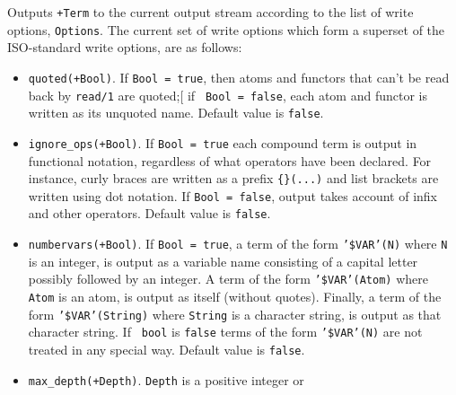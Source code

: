 \begin{description}
%
Outputs {\tt +Term} to the current output stream according to the list
of write options, {\tt Options}.  The current set of write options
which form a superset of the ISO-standard write options, are as
follows:
%
\begin{itemize}
%
\item {\tt quoted(+Bool)}.  If {\tt Bool = true}, then atoms and
  functors that can't be read back by {\tt read/1} are quoted;[ if {\tt
    Bool = false}, each atom and functor is written as its unquoted
  name. Default value is {\tt false}.
%
\item {\tt ignore\_ops(+Bool)}. If {\tt Bool = true} each compound
  term is output in functional notation, regardless of what operators
  have been declared.  For instance, curly braces are written as a
  prefix {\tt \{\}(...)} and list brackets are written using dot
  notation.  If {\tt Bool = false}, output takes account of infix and
  other operators.  Default value is {\tt false}.
%
 \item {\tt numbervars(+Bool)}.  If {\tt Bool = true}, a term of the
   form {\tt '\$VAR'(N)} where {\tt N} is an integer, is output as a
   variable name consisting of a capital letter possibly followed by
   an integer.  A term of the form {\tt '\$VAR'(Atom)} where {\tt
     Atom} is an atom, is output as itself (without quotes).  Finally,
   a term of the form {\tt '\$VAR'(String)} where {\tt String} is a
   character string, is output as that character string.  If {\tt
     bool} is {\tt false} terms of the form {\tt '\$VAR'(N)} are not
   treated in any special way.  Default value is {\tt false}.
%
%
\item {\tt max\_depth(+Depth)}. {\tt Depth} is a positive integer or

\end{itemize}
\end{description}
